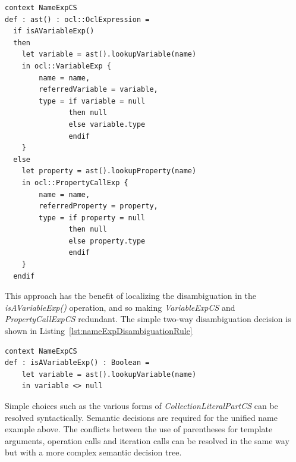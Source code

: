 \documentclass{llncs}
\begin{document}
\begin{lstlisting}[caption=CS2AS description for an ambiguous name expression, label=lst:nameExpDisambiguation, language=OCL]
context NameExpCS
def : ast() : ocl::OclExpression =
  if isAVariableExp() 
  then
    let variable = ast().lookupVariable(name)
    in ocl::VariableExp {
        name = name,
        referredVariable = variable,
        type = if variable = null
               then null
               else variable.type
               endif
    }
  else 
    let property = ast().lookupProperty(name)
    in ocl::PropertyCallExp {
        name = name,
        referredProperty = property,
        type = if property = null
               then null
               else property.type
               endif
    }
  endif	
\end{lstlisting}

This approach has the benefit of localizing the disambiguation in the \emph{isAVariableExp()} operation, and so making \emph{VariableExpCS} and \emph{PropertyCallExpCS} redundant. The simple two-way disambiguation decision is shown in Listing~\ref{lst:nameExpDisambiguationRule}

\begin{lstlisting}[caption=NameExpCS disambigutation rule, label=lst:nameExpDisambiguationRule, language=OCL]
context NameExpCS
def : isAVariableExp() : Boolean =
	let variable = ast().lookupVariable(name)
	in variable <> null
\end{lstlisting}

Simple choices such as the various forms of \emph{CollectionLiteralPartCS} can be resolved syntactically. Semantic decisions are required for the unified name example above. 
The conflicts between the use of parentheses for template arguments, operation calls and iteration calls can be resolved in the same way but with a more complex semantic decision tree.

\end{document}
